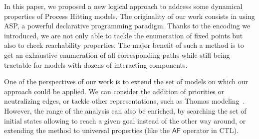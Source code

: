 In this paper, we proposed a new logical approach to address some dynamical properties of Process Hitting models.
The originality of our work consists in using ASP, a powerful declarative programming paradigm.
Thanks to the encoding we introduced, we are not only able to tackle the enumeration of fixed points but also to check reachability properties.
The major benefit of such a method is to get an exhaustive enumeration of all corresponding paths while still being tractable for models with dozens of interacting components.



One of the perspectives of our work is to extend the set of models on which our approach could be applied. We can consider the addition of priorities or neutralizing edges, or tackle other representations,
such as Thomas modeling~\cite{Thomas73}.
However, the range of the analysis can also be enriched,
by searching the set of initial states
allowing to reach a given goal instead of the other way around,
or extending the method to universal properties (like the $\mathsf{AF}$ operator in CTL).
